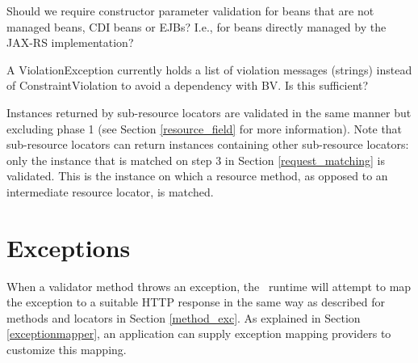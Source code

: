 \begin{ednote}
Should we require constructor parameter validation for beans that are not managed beans, CDI beans or EJBs? I.e., for beans directly managed by the JAX-RS implementation?
\end{ednote}

\begin{ednote}
A ViolationException currently holds a list of violation messages (strings) instead of ConstraintViolation to avoid a dependency with BV. Is this sufficient?
\end{ednote}

Instances returned by sub-resource locators are validated in the same manner but excluding phase 1 (see Section \ref{resource_field} for more information). Note that sub-resource locators can return instances containing other sub-resource locators: only the instance that is matched on step 3 in Section \ref{request_matching} is validated. This is the instance on which a resource method, as opposed to an intermediate resource locator, is matched.

\section{Exceptions}
\label{exceptions_validators}

When a validator method throws an exception, the \jaxrs\ runtime will attempt to map the exception to a suitable HTTP response in the same way as described for methods and locators in Section \ref{method_exc}.  As explained in Section \ref{exceptionmapper}, an application can supply exception mapping providers to customize this mapping.




